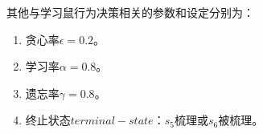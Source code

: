 其他与学习鼠行为决策相关的参数和设定分别为：
\begin{enumerate}[leftmargin=0em, listparindent=2em, parsep=0em, topsep=0em, label=（\theenumi）]
\setlength{\itemindent}{4em}
\setlength{\labelsep}{0em}
\setlength{\labelwidth}{2em}
\setlength{\parsep}{0em}
\setlength{\itemsep}{0em}
\setlength{\topsep}{0em}
  \item 贪心率$\epsilon=0.2$。
  \item 学习率$\alpha=0.8$。
  \item 遗忘率$\gamma=0.8$。
  \item 终止状态$terminal-state$：$s_5$梳理或$s_6$被梳理。%
\end{enumerate}

